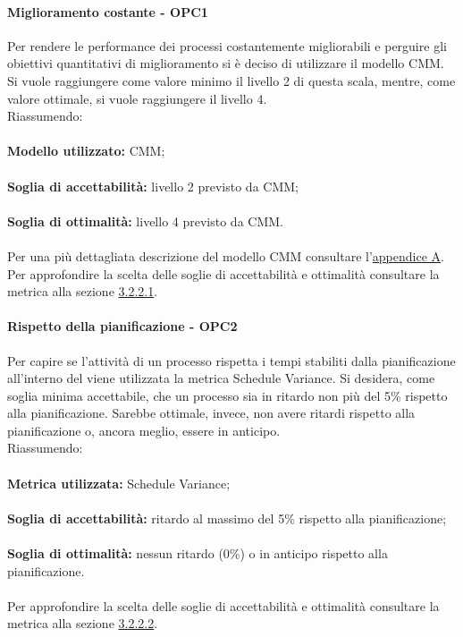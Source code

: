 \documentclass[PianoDiQualifica.tex]{subfiles}
\begin{document}
			\paragraph{Miglioramento costante - OPC1}
			Per rendere le performance dei processi costantemente migliorabili e perguire gli obiettivi quantitativi di miglioramento si è deciso di utilizzare il modello CMM.
			Si vuole raggiungere come valore minimo il livello 2 di questa scala, mentre, come valore ottimale, si vuole raggiungere il livello 4. \\
			Riassumendo: \\ \\
			\textbf{Modello utilizzato:} CMM; \\ \\
			\textbf{Soglia di accettabilità:} livello 2 previsto da CMM; \\ \\
			\textbf{Soglia di ottimalità:} livello 4 previsto da CMM. \\ \\
			Per una più dettagliata descrizione del modello CMM consultare l'\hyperlink{CMM_label}{appendice A}. \\
			Per approfondire la scelta delle soglie di accettabilità e ottimalità consultare la metrica alla sezione \hyperlink{CMM_m}{3.2.2.1}.	
			
			\paragraph{Rispetto della pianificazione - OPC2}
			Per capire se l'attività di un processo rispetta i tempi stabiliti dalla pianificazione all'interno del \PPdocRR{} viene utilizzata la metrica Schedule Variance.
			Si desidera, come soglia minima accettabile, che un processo sia in ritardo non più del 5\% rispetto alla pianificazione. Sarebbe ottimale, invece, non avere ritardi
			rispetto alla pianificazione o, ancora meglio, essere in anticipo.\\
			Riassumendo: \\ \\
			\textbf{Metrica utilizzata:} Schedule Variance; \\ \\
			\textbf{Soglia di accettabilità:} ritardo al massimo del 5\% rispetto alla pianificazione; \\ \\
			\textbf{Soglia di ottimalità:} nessun ritardo (0\%) o in anticipo rispetto alla pianificazione. \\ \\
			Per approfondire la scelta delle soglie di accettabilità e ottimalità consultare la metrica alla sezione \hyperlink{Schedule_m}{3.2.2.2}.	
			
\end{document}
